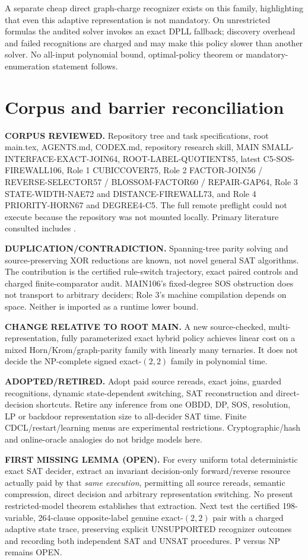 \documentclass[11pt]{article}
\begin{document}
A separate cheap direct graph-charge recognizer exists on this family, highlighting that even this adaptive representation is not mandatory. On unrestricted formulas the audited solver invokes an exact DPLL fallback; discovery overhead and failed recognitions are charged and may make this policy slower than another solver. No all-input polynomial bound, optimal-policy theorem or mandatory-enumeration statement follows.

\section{Corpus and barrier reconciliation}
\textbf{CORPUS REVIEWED.} Repository tree and task specifications, root main.tex, AGENTS.md, CODEX.md, repository research skill, MAIN SMALL-INTERFACE-EXACT-JOIN64, ROOT-LABEL-QUOTIENT85, latest C5-SOS-FIREWALL106, Role 1 CUBICCOVER75, Role 2 FACTOR-JOIN56 / REVERSE-SELECTOR57 / BLOSSOM-FACTOR60 / REPAIR-GAP64, Role 3 STATE-WIDTH-NAE72 and DISTANCE-FIREWALL73, and Role 4 PRIORITY-HORN67 and DEGREE4-C5. The full remote preflight could not execute because the repository was not mounted locally. Primary literature consulted includes \cite{marques,bacchus,colnet,kautz}.

\textbf{DUPLICATION/CONTRADICTION.} Spanning-tree parity solving and source-preserving XOR reductions are known, not novel general SAT algorithms. The contribution is the certified rule-switch trajectory, exact paired controls and charged finite-comparator audit. MAIN106's fixed-degree SOS obstruction does not transport to arbitrary deciders; Role 3's machine compilation depends on space. Neither is imported as a runtime lower bound.

\textbf{CHANGE RELATIVE TO ROOT MAIN.} A new source-checked, multi-representation, fully parameterized exact hybrid policy achieves linear cost on a mixed Horn/Krom/graph-parity family with linearly many ternaries. It does not decide the NP-complete signed exact-$(2,2)$ family in polynomial time.

\textbf{ADOPTED/RETIRED.} Adopt paid source rereads, exact joins, guarded recognitions, dynamic state-dependent switching, SAT reconstruction and direct-decision shortcuts. Retire any inference from one OBDD, DP, SOS, resolution, LP or backdoor representation size to all-decider SAT time. Finite CDCL/restart/learning menus are experimental restrictions. Cryptographic/hash and online-oracle analogies do not bridge models here.

\textbf{FIRST MISSING LEMMA (OPEN).} For every uniform total deterministic exact SAT decider, extract an invariant decision-only forward/reverse resource actually paid by that \emph{same execution}, permitting all source rereads, semantic compression, direct decision and arbitrary representation switching. No present restricted-model theorem establishes that extraction. Next test the certified 198-variable, 264-clause opposite-label genuine exact-$(2,2)$ pair with a charged adaptive state trace, preserving explicit UNSUPPORTED recognizer outcomes and recording both independent SAT and UNSAT procedures. P versus NP remains OPEN.
\end{document}

